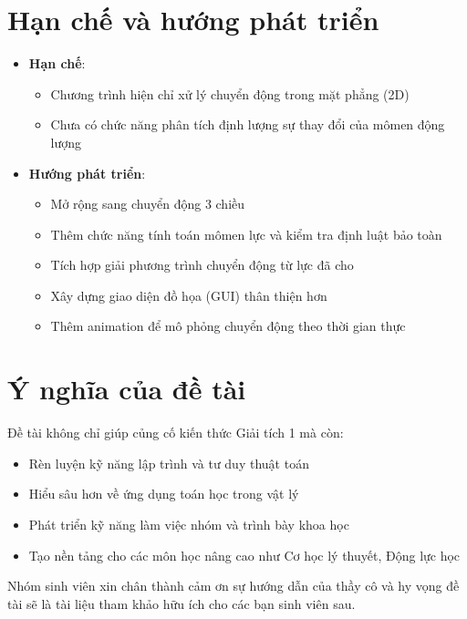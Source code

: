 \documentclass{report}
\begin{document}
\section*{Hạn chế và hướng phát triển}
\begin{itemize}
    \item \textbf{Hạn chế}: 
    \begin{itemize}
        \item Chương trình hiện chỉ xử lý chuyển động trong mặt phẳng (2D)
        \item Chưa có chức năng phân tích định lượng sự thay đổi của mômen động lượng
    \end{itemize}
    
    \item \textbf{Hướng phát triển}:
    \begin{itemize}
        \item Mở rộng sang chuyển động 3 chiều
        \item Thêm chức năng tính toán mômen lực và kiểm tra định luật bảo toàn
        \item Tích hợp giải phương trình chuyển động từ lực đã cho
        \item Xây dựng giao diện đồ họa (GUI) thân thiện hơn
        \item Thêm animation để mô phỏng chuyển động theo thời gian thực
    \end{itemize}
\end{itemize}

\section*{Ý nghĩa của đề tài}
Đề tài không chỉ giúp củng cố kiến thức Giải tích 1 mà còn:
\begin{itemize}
    \item Rèn luyện kỹ năng lập trình và tư duy thuật toán
    \item Hiểu sâu hơn về ứng dụng toán học trong vật lý
    \item Phát triển kỹ năng làm việc nhóm và trình bày khoa học
    \item Tạo nền tảng cho các môn học nâng cao như Cơ học lý thuyết, Động lực học
\end{itemize}

Nhóm sinh viên xin chân thành cảm ơn sự hướng dẫn của thầy cô và hy vọng đề tài sẽ là tài liệu tham khảo hữu ích cho các bạn sinh viên sau.

\printbibliography[title={Tài liệu tham khảo}]
\end{document}
